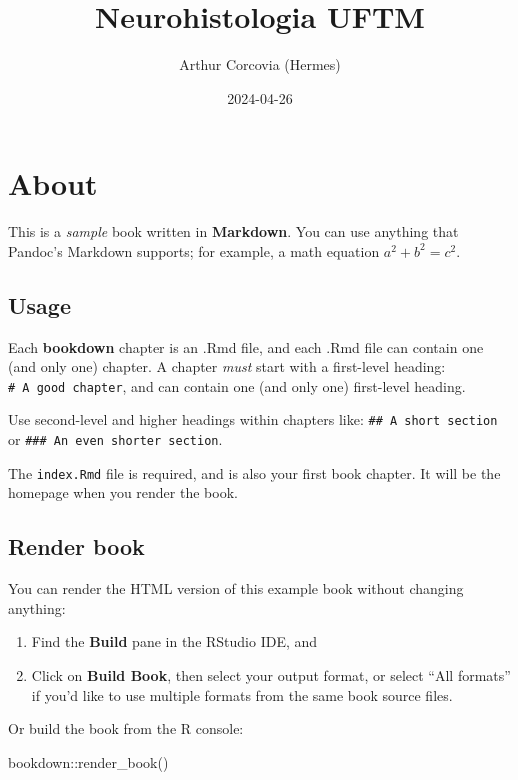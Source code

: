 \documentclass[
]{book}
\title{Neurohistologia UFTM}
\author{Arthur Corcovia (Hermes)}
\date{2024-04-26}
\newenvironment{Shaded}{\begin{snugshade}}{\end{snugshade}}
\newcommand{\FunctionTok}[1]{\textcolor[rgb]{0.00,0.00,0.00}{#1}}
\newcommand{\NormalTok}[1]{#1}
\newcommand{\SpecialCharTok}[1]{\textcolor[rgb]{0.00,0.00,0.00}{#1}}
\theoremstyle{definition}
\theoremstyle{definition}
\theoremstyle{definition}
\theoremstyle{definition}
\theoremstyle{remark}
\begin{document}
\maketitle

{
\setcounter{tocdepth}{1}
\tableofcontents
}
\hypertarget{about}{%
\chapter{About}\label{about}}

This is a \emph{sample} book written in \textbf{Markdown}. You can use anything that Pandoc's Markdown supports; for example, a math equation \(a^2 + b^2 = c^2\).

\hypertarget{usage}{%
\section{Usage}\label{usage}}

Each \textbf{bookdown} chapter is an .Rmd file, and each .Rmd file can contain one (and only one) chapter. A chapter \emph{must} start with a first-level heading: \texttt{\#\ A\ good\ chapter}, and can contain one (and only one) first-level heading.

Use second-level and higher headings within chapters like: \texttt{\#\#\ A\ short\ section} or \texttt{\#\#\#\ An\ even\ shorter\ section}.

The \texttt{index.Rmd} file is required, and is also your first book chapter. It will be the homepage when you render the book.

\hypertarget{render-book}{%
\section{Render book}\label{render-book}}

You can render the HTML version of this example book without changing anything:

\begin{enumerate}
\def\labelenumi{\arabic{enumi}.}
\item
  Find the \textbf{Build} pane in the RStudio IDE, and
\item
  Click on \textbf{Build Book}, then select your output format, or select ``All formats'' if you'd like to use multiple formats from the same book source files.
\end{enumerate}

Or build the book from the R console:

\begin{Shaded}
\begin{Highlighting}[]
\NormalTok{bookdown}\SpecialCharTok{::}\FunctionTok{render\_book}\NormalTok{()}
\end{Highlighting}
\end{Shaded}
\end{document}
